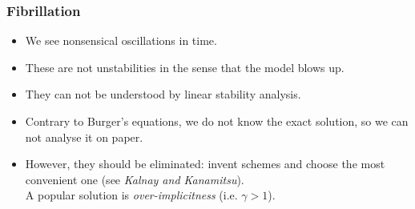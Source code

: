 \documentclass[aspectratio=43,9pt]{beamer}
\begin{document}
%
\begin{frame}
	\frametitle{Fibrillation}
	\begin{itemize}
		\item We see nonsensical oscillations in time.\vspace*{1ex}
		\item These are not unstabilities in the sense that the model blows up.\vspace*{1ex}
		\item They can not be understood by linear stability analysis.\vspace*{1ex}
		\item Contrary to Burger's equations, we do not know the exact solution, so we can not analyse it on paper.\vspace*{1ex}
		\item However, they should be eliminated: invent schemes and choose the most convenient one (see \emph{Kalnay and Kanamitsu}).\\[1ex]
			A popular solution is \emph{over-implicitness} (i.e. $\gamma>1$).
	\end{itemize}
\end{frame}
%
%
\end{document}
